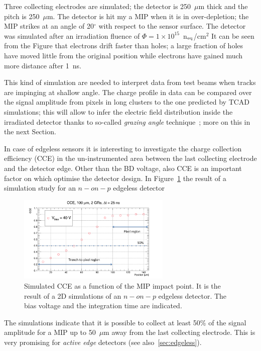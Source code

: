Three collecting electrodes are simulated; the detector is 250~$\mu$m thick and the pitch 
is 250~$\mu$m. The detector is hit my a MIP when it is in over-depletion; the MIP strikes at 
an angle of 20$^{\circ}$ with respect to the sensor surface. The detector was simulated after 
an irradiation fluence of $\Phi=1\times10^{15}$~n$_{\rm eq}$/cm$^2$
It can be seen from the Figure that electrons drift faster than holes; a large fraction of holes 
have moved little from the original position while electrons have gained much more distance 
after 1~ns. 

This kind of simulation are needed to interpret data from test beams when tracks are impinging 
at shallow angle. The charge profile in data can be compared over the signal amplitude from pixels in 
long clusters to the one predicted by TCAD simulations; this will allow to infer the electric field 
distribution inside the irradiated detector thanks to so-called {\it grazing angle} 
technique~\cite{Henrich:687041,Lari:2001qqa}; more 
on this in the next Section.

In case of edgeless sensors it is interesting to investigate the charge collection efficiency (CCE) 
in the un-instrumented area between the last collecting electrode and the detector edge. 
Other than the BD voltage, also CCE is an important factor on which optimise the 
detector design. In Figure~\ref{fig:Edgeless_CCE} the result of a simulation study for an 
$n-on-p$ edgeless detector 
\begin{figure}[!htbp]
\centering
\includegraphics[width=0.65\textwidth]{Edgeless_CCE.png}
\caption{\label{fig:Edgeless_CCE}Simulated CCE as a function of the MIP impact point. 
It is the result of a 2D simulations of an $n-on-p$ edgeless detector. The bias voltage and the integration time 
are indicated.}
\end{figure}

The simulations indicate that it is possible to collect at least 50\% of the signal amplitude for a MIP 
up to 50~$\mu$m away from the last collecting electrode. This is very promising for {\it active edge} 
detectors  (see also~\ref{sec:edgeless}).

